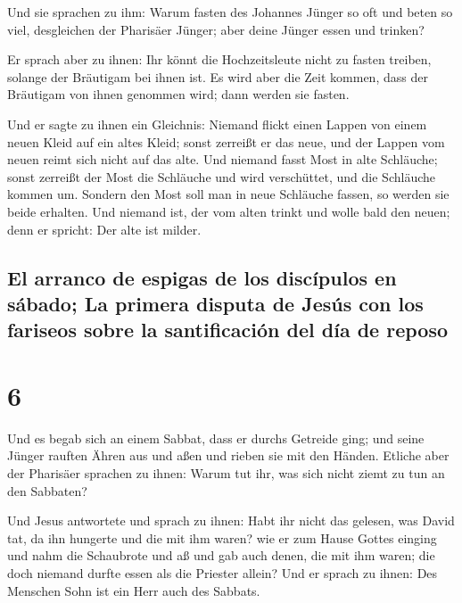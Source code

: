  Und sie sprachen zu ihm: Warum fasten des Johannes
Jünger so oft und beten so viel, desgleichen der Pharisäer Jünger; aber
deine Jünger essen und trinken?

 Er sprach aber zu ihnen: Ihr könnt die Hochzeitsleute
nicht zu fasten treiben, solange der Bräutigam bei ihnen ist.
 Es wird aber die Zeit kommen, dass der Bräutigam von
ihnen genommen wird; dann werden sie fasten.

 Und er sagte zu ihnen ein Gleichnis: Niemand flickt
einen Lappen von einem neuen Kleid auf ein altes Kleid; sonst zerreißt
er das neue, und der Lappen vom neuen reimt sich nicht auf das alte.
 Und niemand fasst Most in alte Schläuche; sonst zerreißt
der Most die Schläuche und wird verschüttet, und die Schläuche kommen
um.  Sondern den Most soll man in neue Schläuche fassen,
so werden sie beide erhalten.  Und niemand ist, der vom
alten trinkt und wolle bald den neuen; denn er spricht: Der alte ist
milder.

\hypertarget{el-arranco-de-espigas-de-los-discuxedpulos-en-suxe1bado-la-primera-disputa-de-jesuxfas-con-los-fariseos-sobre-la-santificaciuxf3n-del-duxeda-de-reposo}{%
\subsection{El arranco de espigas de los discípulos en sábado; La
primera disputa de Jesús con los fariseos sobre la santificación del día
de
reposo}\label{el-arranco-de-espigas-de-los-discuxedpulos-en-suxe1bado-la-primera-disputa-de-jesuxfas-con-los-fariseos-sobre-la-santificaciuxf3n-del-duxeda-de-reposo}}

\hypertarget{section-5}{%
\section{6}\label{section-5}}

 Und es begab sich an einem Sabbat, dass er durchs
Getreide ging; und seine Jünger rauften Ähren aus und aßen und rieben
sie mit den Händen.  Etliche aber der Pharisäer sprachen
zu ihnen: Warum tut ihr, was sich nicht ziemt zu tun an den Sabbaten?

 Und Jesus antwortete und sprach zu ihnen: Habt ihr nicht
das gelesen, was David tat, da ihn hungerte und die mit ihm waren?
 wie er zum Hause Gottes einging und nahm die Schaubrote
und aß und gab auch denen, die mit ihm waren; die doch niemand durfte
essen als die Priester allein?  Und er sprach zu ihnen:
Des Menschen Sohn ist ein Herr auch des Sabbats.

